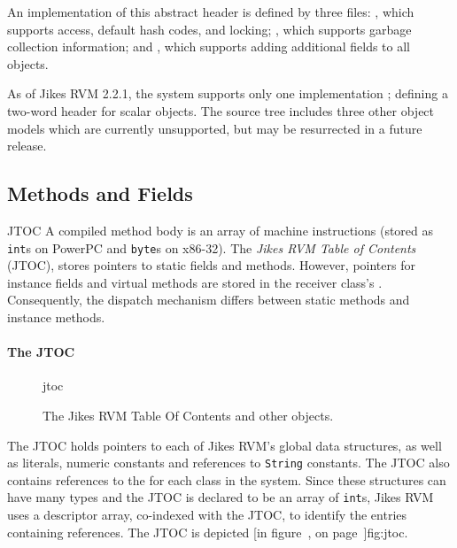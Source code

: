 An implementation of this abstract header is defined by three files: 
, which supports
 access, default hash codes, and locking; 
, which
supports garbage collection information; 
and 
, which supports
adding additional fields to all objects. 

As of Jikes RVM 2.2.1, the system supports only one implementation
; 
defining a two-word header for scalar objects.  The source tree includes
three other object models which are currently unsupported, but may be
resurrected in a future release.

\subsection{Methods and Fields}\label{sssec:methods}
\begin{Label}{JTOC}
A compiled method body is an array of machine instructions (stored as
{\tt int}s on PowerPC\TMweb{} and {\tt byte}s on x86-32). 
The {\em Jikes RVM Table of Contents} (JTOC),
stores pointers to static fields and methods.  However, 
pointers for instance fields and virtual methods are stored in the receiver 
class's .  Consequently, the dispatch mechanism differs
between static methods and instance methods.
\end{Label}

\paragraph{The JTOC}
\begin{figure}[htb]
\begin{gif}{jtoc}
\vbox{
\hbox{}
}\hfil
\end{gif}
\caption{The Jikes RVM Table Of Contents and other objects.}
\label{fig:jtoc}
\end{figure}
The JTOC holds pointers to 
each of Jikes\TMweb{} RVM's global data structures, as well as
literals, numeric constants and references to \texttt{String} constants.
The JTOC also
contains references to the  for each class in the system.  
Since these 
structures can have many types and the JTOC is declared to be an array of 
{\tt int}s,  
Jikes RVM uses a descriptor array, co-indexed with the JTOC, 
to identify the entries containing references.
The JTOC
is depicted [in figure~\Ref, on page~\Pageref{}]{fig:jtoc}.  

